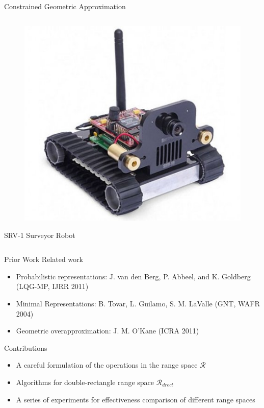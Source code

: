 \documentclass[10pt]{beamer}
\begin{document}
\begin{frame}{Constrained Geometric Approximation}
\begin{columns}
\begin{column}{.35\textwidth}
\begin{figure}
    \includegraphics[scale=0.2]{figs/srvq.jpg}
    \end{figure}
    SRV-1 Surveyor Robot
  \end{column}
\end{columns}
\end{frame}

\begin{frame}{Prior Work}
Related work
\begin{itemize}
\item Probabilistic representations: J. van den Berg,
  P. Abbeel, and K. Goldberg (LQG-MP, IJRR 2011)
\item Minimal Representations: B. Tovar, L. Guilamo, S. M. LaValle (GNT, WAFR 2004)
\item Geometric overapproximation: J. M. O'Kane (ICRA 2011)
\end{itemize}
Contributions
\begin{itemize}
\item A careful formulation of the operations in the range space $\mathcal{R}$
\item Algorithms for double-rectangle range space $\mathcal{R}_{drect}$
\item A series of experiments for effectiveness comparison of different range spaces
\end{itemize}
\end{frame}
\end{document}

